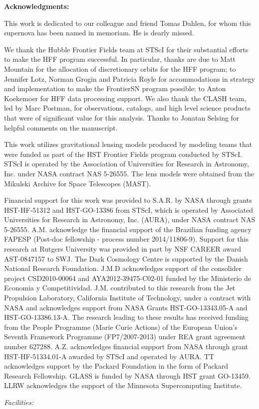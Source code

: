 \documentclass[iop]{emulateapj}
\begin{document}
\bigskip


{\bf Acknowledgments:}

This work is dedicated to our colleague and friend Tomas Dahlen, for
whom this supernova has been named in memoriam. He is dearly missed.

We thank the Hubble Frontier Fields team at STScI for their
substantial efforts to make the HFF program successful.  In
particular, thanks are due to Matt Mountain for the allocation of
discretionary orbits for the HFF program; to Jennifer Lotz, Norman
Grogin and Patricia Royle for accommodations in strategy and
implementation to make the FrontierSN program possible; to Anton
Koekemoer for HFF data processing support.  We also thank
the CLASH team, led by Marc Postman, for observations, catalogs, and
high level science products that were of significant value for this
analysis.  Thanks to Jonatan Selsing for helpful comments on the
manuscript.

This work utilizes gravitational lensing models produced by modeling
teams that were funded as part of the HST Frontier Fields program
conducted by STScI. STScI is operated by the Association of
Universities for Research in Astronomy, Inc. under NASA contract NAS
5-26555. The lens models were obtained from the Mikulski Archive for
Space Telescopes (MAST).

Financial support for this work was provided to S.A.R. by NASA through
grants HST-HF-51312 and HST-GO-13386 from STScI, which is operated by
Associated Universities for Research in Astronomy, Inc. (AURA), under
NASA contract NAS 5-26555. A.M. acknowledge the financial support of
the Brazilian funding agency FAPESP (Post-doc fellowship - process
number 2014/11806-9). Support for this research at Rutgers University
was provided in part by NSF CAREER award AST-0847157 to SWJ.  The Dark
Cosmology Centre is supported by the Danish National Research
Foundation. J.M.D acknowledges support of the consolider project
CSD2010-00064 and AYA2012-39475-C02-01 funded by the Ministerio de
Economia y Competitividad. J.M. contributed to this research from the
Jet Propulsion Laboratory, California Institute of Technology, under a
contract with NASA and acknowledges support from NASA Grants
HST-GO-13343.05-A and HST-GO-13386.13-A. The research leading to these
results has received funding from the People Programme (Marie Curie
Actions) of the European Union's Seventh Framework Programme
(FP7/2007-­2013) under REA grant agreement number
627288. A.Z. acknowledges financial support from NASA through grant
HST-HF-51334.01-A awarded by STScI and operated by AURA. 
TT acknowledges support by the Packard Foundation in the form of Packard Research Fellowship. GLASS is funded by NASA through HST grant GO-13459. LLRW
acknowledges the support of the Minnesota Supercomputing Institute.

{\it Facilities:} 
\pagebreak

%



\end{document}
